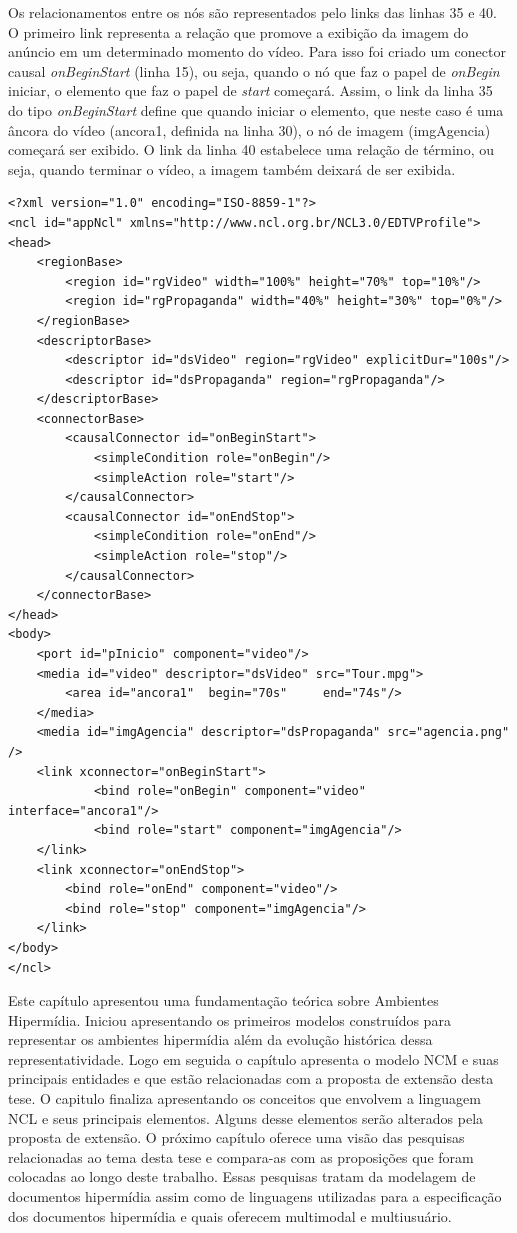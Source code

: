 Os relacionamentos entre os nós são representados pelo links das linhas 35 e 40. O primeiro link representa a relação que promove a exibição da imagem do anúncio em um determinado momento do vídeo. Para isso foi criado um conector causal \textit{onBeginStart} (linha 15), ou seja, quando o nó que faz o papel de \textit{onBegin} iniciar, o elemento que faz o papel de \textit{start} começará. Assim, o link da linha 35 do tipo \textit{onBeginStart} define que quando iniciar o elemento, que neste caso é uma âncora do vídeo (ancora1, definida na linha 30), o nó de imagem (imgAgencia) começará ser exibido. O link da linha 40 estabelece uma relação de término, ou seja, quando terminar o vídeo, a imagem também deixará de ser exibida.

\begin{lstlisting}[label=lst:exemplo_NCL, caption={Exemplo de uma aplicação NCL}, language=ncl]
<?xml version="1.0" encoding="ISO-8859-1"?>
<ncl id="appNcl" xmlns="http://www.ncl.org.br/NCL3.0/EDTVProfile">
<head>
    <regionBase>
        <region id="rgVideo" width="100%" height="70%" top="10%"/>
        <region id="rgPropaganda" width="40%" height="30%" top="0%"/>
	</regionBase>
	<descriptorBase>
		<descriptor id="dsVideo" region="rgVideo" explicitDur="100s"/>
		<descriptor id="dsPropaganda" region="rgPropaganda"/>
	</descriptorBase>
	<connectorBase>
		<causalConnector id="onBeginStart">
			<simpleCondition role="onBegin"/>
			<simpleAction role="start"/>
		</causalConnector>
		<causalConnector id="onEndStop">
			<simpleCondition role="onEnd"/>
			<simpleAction role="stop"/>
		</causalConnector>
	</connectorBase>
</head>
<body>
	<port id="pInicio" component="video"/>
	<media id="video" descriptor="dsVideo" src="Tour.mpg">
		<area id="ancora1" 	begin="70s" 	end="74s"/>
	</media>
	<media id="imgAgencia" descriptor="dsPropaganda" src="agencia.png" />
	<link xconnector="onBeginStart">
			<bind role="onBegin" component="video" interface="ancora1"/>
			<bind role="start" component="imgAgencia"/>
	</link>
	<link xconnector="onEndStop">
		<bind role="onEnd" component="video"/>
		<bind role="stop" component="imgAgencia"/>
	</link>
</body>
</ncl>
\end{lstlisting}

Este capítulo apresentou uma fundamentação teórica sobre Ambientes Hipermídia. Iniciou apresentando os primeiros modelos construídos para representar os ambientes hipermídia além da evolução histórica dessa representatividade. Logo em seguida o capítulo apresenta o modelo NCM e suas principais entidades e que estão relacionadas com a proposta de extensão desta tese. O capitulo finaliza apresentando os conceitos que envolvem a linguagem NCL e seus principais elementos. Alguns desse elementos serão alterados pela proposta de extensão. O próximo capítulo oferece uma visão das pesquisas relacionadas ao tema desta tese e compara-as com as proposições que foram colocadas ao longo deste trabalho. Essas pesquisas tratam da modelagem de documentos hipermídia assim como de linguagens utilizadas para a especificação dos documentos hipermídia e quais oferecem multimodal e multiusuário.